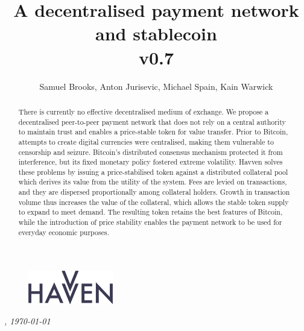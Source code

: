 \documentclass{article}
\theoremstyle{definition}
\theoremstyle{plain} %
\begin{document}
\newcommand{\HAV}{\textsc{hav}}
\newcommand{\NOM}{\textsc{nom}}


\title{A decentralised payment network and stablecoin\\ v0.7}
\author{Samuel Brooks, Anton Jurisevic, Michael Spain, Kain Warwick}
\date{}

\begin{figure}
    \centering
    \includegraphics[width=0.33\textwidth]{img/havvenlogo}
\end{figure}
\maketitle

\hfill

\begin{abstract}
\noindent There is currently no effective decentralised medium of exchange. We propose a decentralised peer-to-peer payment network that does not rely on a central authority to maintain trust and enables a price-stable token for value transfer. Prior to Bitcoin, attempts to create digital currencies were centralised, making them vulnerable to censorship and seizure. Bitcoin’s distributed consensus mechanism protected it from interference, but its fixed monetary policy fostered extreme volatility. Havven solves these problems by issuing a price-stabilised token against a distributed collateral pool which derives its value from the utility of the system. Fees are levied on transactions, and they are dispersed proportionally among collateral holders. Growth in transaction volume thus increases the value of the collateral, which allows the stable token supply to expand to meet demand. The resulting token retains the best features of Bitcoin, while the introduction of price stability enables the payment network to be used for everyday economic purposes.
\end{abstract}	
\vspace{20mm}
\begin{center}
  \small{\textit{\currenttime , \today}}
\end{center}

\end{document}
